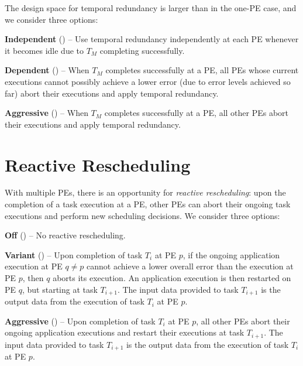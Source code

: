 The design space for temporal redundancy is larger than in the one-PE case,
and we consider three options: 
\begin{compactitem}
	\item \textbf{Independent} (\independent) -- Use temporal redundancy 
	independently at each PE whenever it becomes idle due to 
	$T_M$ completing successfully.

	\item \textbf{Dependent} (\dependent) -- When $T_M$ completes successfully at a PE,
	  all PEs whose current executions cannot possibly achieve a lower error (due
	  to error levels achieved so far) abort their executions and apply
	  temporal redundancy.

	\item \textbf{Aggressive} (\aggressive) -- When $T_M$ completes successfully
	at a PE, all other PEs abort their
	executions and apply temporal redundancy.

\end{compactitem}


\section{Reactive Rescheduling}

With multiple PEs, there is an opportunity for
\emph{reactive rescheduling}: upon the completion 
of a task execution at a PE, other PEs can abort their ongoing task
executions and perform new scheduling decisions.  We consider three
options:

\begin{compactitem}
	\item \textbf{Off} (\off) -- No reactive rescheduling.

	\item \textbf{Variant} (\variant) -- Upon completion of task $T_i$ at
	PE $p$, if the ongoing application execution at PE $q{\neq}p$
	cannot achieve a lower overall error than the execution at PE
	$p$, then $q$ aborts its execution. An application execution
	is then restarted on PE $q$, but starting at task $T_{i+1}$. The
	input data provided to task $T_{i+1}$ is the output data from
	the execution of task $T_{i}$ at PE $p$.

	\item \textbf{Aggressive} (\aggressive) -- Upon completion of task $T_i$ at
	PE $p$, all other PEs abort their ongoing application executions
	and restart their executions at task $T_{i+1}$. The input data
	provided to task $T_{i+1}$ is the output data from the execution of
	task $T_{i}$ at PE $p$.
\end{compactitem}
\noindent


